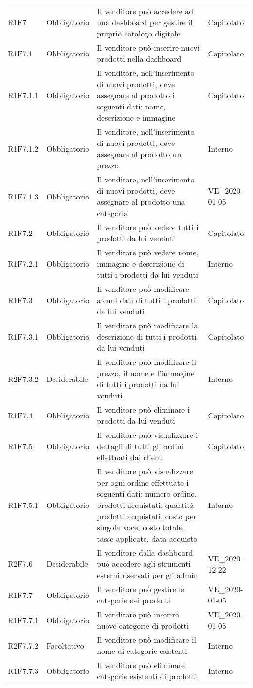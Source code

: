 {\begin{longtable}{C{2.5cm} C{2.8cm} C{6.7cm} C{2.5cm}}
R1F7 & Obbligatorio & Il venditore può accedere ad una dashboard per gestire il proprio catalogo digitale & Capitolato \\
R1F7.1 & Obbligatorio & Il venditore può inserire nuovi prodotti nella dashboard & Capitolato \\
R1F7.1.1 & Obbligatorio & Il venditore, nell'inserimento di nuovi prodotti, deve assegnare al prodotto i seguenti dati: nome, descrizione e immagine & Capitolato \\
R1F7.1.2 & Obbligatorio & Il venditore, nell'inserimento di nuovi prodotti, deve assegnare al prodotto un prezzo & Interno \\ 
R1F7.1.3 & Obbligatorio & Il venditore, nell'inserimento di nuovi prodotti, deve assegnare al prodotto una categoria & VE\_2020-01-05 \\ 
R1F7.2 & Obbligatorio & Il venditore può vedere tutti i prodotti da lui venduti & Capitolato \\
R1F7.2.1 & Obbligatorio & Il venditore può vedere nome, immagine e descrizione di tutti i prodotti da lui venduti & Interno \\
R1F7.3 & Obbligatorio & Il venditore può modificare alcuni dati di tutti i prodotti da lui venduti & Capitolato \\
R1F7.3.1 & Obbligatorio & Il venditore può modificare la descrizione di tutti i prodotti da lui venduti & Capitolato \\
R2F7.3.2 & Desiderabile & Il venditore può modificare il prezzo, il nome e l'immagine di tutti i prodotti da lui venduti & Interno \\
R1F7.4 & Obbligatorio & Il venditore può eliminare i prodotti da lui venduti & Capitolato \\
R1F7.5 & Obbligatorio & Il venditore può visualizzare i dettagli di tutti gli ordini effettuati dai clienti & Capitolato \\
R1F7.5.1 & Obbligatorio & Il venditore può visualizzare per ogni ordine effettuato i seguenti dati: numero ordine, prodotti acquistati, quantità prodotti acquistati, costo per singola voce, costo totale, tasse applicate, data acquisto & Interno \\
R2F7.6 & Desiderabile & Il venditore dalla dashboard può accedere agli strumenti esterni riservati per gli admin & VE\_2020-12-22 \\
R1F7.7 & Obbligatorio & Il venditore può gestire le categorie dei prodotti & VE\_2020-01-05 \\
R1F7.7.1 & Obbligatorio & Il venditore può inserire nuove categorie di prodotti & VE\_2020-01-05 \\
R2F7.7.2 & Facoltativo & Il venditore può modificare il nome di categorie esistenti & Interno \\
R1F7.7.3 & Obbligatorio & Il venditore può eliminare categorie esistenti di prodotti & Interno \\


\end{longtable}}
